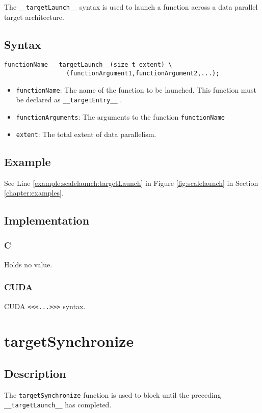 The \verb+__targetLaunch__+ syntax is used to launch a function across a data parallel target architecture.

\subsection{Syntax}
\begin{verbatim}
functionName __targetLaunch__(size_t extent) \
                 (functionArgument1,functionArgument2,...);
\end{verbatim}

\begin{itemize}
\item \verb+functionName+: The name of the function to be launched. This function must be declared as \verb+__targetEntry__+ .
\item \verb+functionArguments+: The arguments to the function \verb+functionName+  
\item \verb+extent+: The total extent of data parallelism.
\end{itemize}


\subsection{Example}
See Line \ref{example:scalelaunch:targetLaunch} in Figure \ref{fig:scalelaunch} in Section \ref{chapter:examples}.

\subsection{Implementation}
\subsubsection{C}
Holds no value.
\subsubsection{CUDA}
CUDA \verb+<<<...>>>+ syntax.

\newpage
\section{targetSynchronize}

\subsection{Description}

The \verb+targetSynchronize+ function is used to block until the preceding \verb+__targetLaunch__+ has completed.

